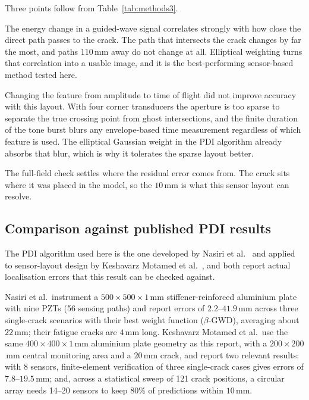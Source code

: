 Three points follow from Table~\ref{tab:methods3}.

The energy change in a guided-wave signal correlates strongly with how close the direct path passes to the
crack. The path that intersects the crack changes by far the most, and paths 110\,mm away do not change at
all. Elliptical weighting turns that correlation into a usable image, and it is the best-performing
sensor-based method tested here.

Changing the feature from amplitude to time of flight did not improve accuracy with this layout. With four
corner transducers the aperture is too sparse to separate the true crossing point from ghost intersections,
and the finite duration of the tone burst blurs any envelope-based time measurement regardless of which
feature is used. The elliptical Gaussian weight in the PDI algorithm already absorbs that blur, which is why
it tolerates the sparse layout better.

The full-field check settles where the residual error comes from. The crack sits where it was placed in the
model, so the $10$\,mm is what this sensor layout can resolve.

\subsection{Comparison against published PDI results}
\label{sec:litcompare}

The PDI algorithm used here is the one developed by Nasiri et al.~\cite{Nasiri2022} and applied to sensor-layout
design by Keshavarz Motamed et al.~\cite{Motamed2019}, and both report actual localisation errors that this
result can be checked against.

Nasiri et al.\ instrument a $500\times500\times1$\,mm stiffener-reinforced aluminium plate with nine PZTs (56
sensing paths) and report errors of $2.2$--$41.9$\,mm across three single-crack scenarios with their best weight
function ($\beta$-GWD), averaging about $22$\,mm; their fatigue cracks are $4$\,mm long. Keshavarz Motamed
et al.\ use the same $400\times400\times1$\,mm aluminium plate geometry as this report, with a $200\times200$\,mm
central monitoring area and a $20$\,mm crack, and report two relevant results: with 8 sensors, finite-element
verification of three single-crack cases gives errors of $7.8$--$19.5$\,mm; and, across a statistical sweep of 121
crack positions, a circular array needs 14--20 sensors to keep 80\% of predictions within $10$\,mm.


